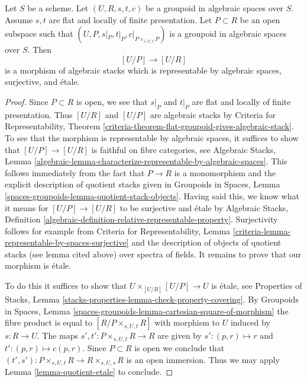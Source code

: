 \begin{lemma}
\label{lemma-quasi-splitting-etale}
Let $S$ be a scheme.
Let $(U, R, s, t, c)$ be a groupoid in algebraic spaces over $S$.
Assume $s, t$ are flat and locally of finite presentation.
Let $P \subset R$ be an open subspace such that
$(U, P, s|_P, t|_P, c|_{P \times_{s, U, t} P})$ is a
groupoid in algebraic spaces over $S$. Then
$$
[U/P] \longrightarrow [U/R]
$$
is a morphism of algebraic stacks which
is representable by algebraic spaces, surjective, and \'etale.
\end{lemma}

\begin{proof}
Since $P \subset R$ is open, we see that $s|_P$ and $t|_P$
are flat and locally of finite presentation.
Thus $[U/R]$ and $[U/P]$ are algebraic stacks by
Criteria for Representability, Theorem
\ref{criteria-theorem-flat-groupoid-gives-algebraic-stack}.
To see that the morphism is representable by algebraic spaces,
it suffices to show that $[U/P] \to [U/R]$ is faithful on
fibre categories, see
Algebraic Stacks, Lemma
\ref{algebraic-lemma-characterize-representable-by-algebraic-spaces}.
This follows immediately from the fact that $P \to R$ is a monomorphism
and the explicit description of quotient stacks given in
Groupoids in Spaces, Lemma
\ref{spaces-groupoids-lemma-quotient-stack-objects}.
Having said this, we know what it means for
$[U/P] \to [U/R]$ to be surjective and \'etale by
Algebraic Stacks, Definition
\ref{algebraic-definition-relative-representable-property}.
Surjectivity follows for example from
Criteria for Representability,
Lemma \ref{criteria-lemma-representable-by-spaces-surjective}
and the description of objects of quotient stacks
(see lemma cited above) over spectra of fields.
It remains to prove that our morphism is \'etale.

\medskip\noindent
To do this it suffices to show that $U \times_{[U/R]} [U/P] \to U$
is \'etale, see Properties of Stacks, Lemma
\ref{stacks-properties-lemma-check-property-covering}.
By Groupoids in Spaces, Lemma
\ref{spaces-groupoids-lemma-cartesian-square-of-morphism}
the fibre product is equal to $[R/P \times_{s, U, t} R]$
with morphism to $U$ induced by $s : R \to U$.
The maps $s', t' : P \times_{s, U, t} R \to R$ are given by
$s' : (p, r) \mapsto r$ and $t' : (p, r) \mapsto c(p, r)$. Since
$P \subset R$ is open we conclude that
$(t', s') : P \times_{s, U, t} R \to R \times_{s, U, s} R$
is an open immersion.
Thus we may apply Lemma \ref{lemma-quotient-etale}
to conclude.
\end{proof}


